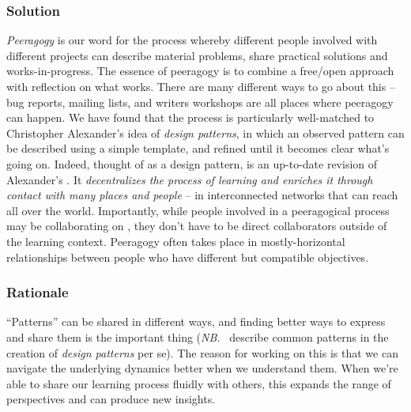 \subsubsection*{Solution} \emph{Peeragogy} is our word for the process whereby different people involved with different projects can describe material problems, share practical solutions and works-in-progress.  The essence of peeragogy is to combine a free/open approach with reflection on what works.  There are many different ways to go about this -- bug reports, mailing lists, and writers workshops are all places where peeragogy can happen.  We have found that the process is particularly well-matched to Christopher Alexander's idea of \emph{design patterns}, in which an observed pattern can be described using a simple template, and refined until it becomes clear what's going on.  Indeed, thought of as a design pattern,  is an up-to-date revision of Alexander's  \cite[p. 99]{alexander1977pattern}.  It \emph{decentralizes the process of learning and enriches it through contact with many places and people} -- in interconnected networks that can reach all over the world.   Importantly, while people involved in a peeragogical process may be collaborating on , they don't have to be direct collaborators outside of the learning context.  Peeragogy often takes place in mostly-horizontal relationships between people who have different but compatible objectives.

\subsubsection*{Rationale}
``Patterns'' can be shared in different ways, and finding better ways to express and share them is the important thing (\emph{NB.}~\cite{meszaros1998pattern} describe common patterns in the creation of \emph{design patterns} per se).  The reason for working on this is that we can navigate the underlying dynamics better when we understand them.  When we're able to share our learning process fluidly with others, this expands the range of perspectives and can produce new insights. 


